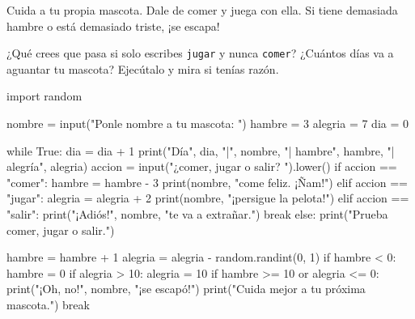 
Cuida a tu propia mascota. Dale de comer y juega con ella. Si tiene demasiada hambre o está demasiado triste, ¡se escapa!

\begin{center}
\begin{scratch}[scale=0.8]
\end{scratch}
\end{center}

\begin{think}
¿Qué crees que pasa si solo escribes \texttt{jugar} y nunca \texttt{comer}? ¿Cuántos días va a aguantar tu mascota? Ejecútalo y mira si tenías razón.
\end{think}

\begin{typethis}
import random

nombre = input("Ponle nombre a tu mascota: ")
hambre = 3
alegria = 7
dia = 0

while True:
    dia = dia + 1
    print("Día", dia, "|", nombre, "| hambre", hambre,
          "| alegría", alegria)
    accion = input("¿comer, jugar o salir? ").lower()
    if accion == "comer":
        hambre = hambre - 3
        print(nombre, "come feliz. ¡Ñam!")
    elif accion == "jugar":
        alegria = alegria + 2
        print(nombre, "¡persigue la pelota!")
    elif accion == "salir":
        print("¡Adiós!", nombre, "te va a extrañar.")
        break
    else:
        print("Prueba comer, jugar o salir.")

    hambre = hambre + 1
    alegria = alegria - random.randint(0, 1)
    if hambre < 0:
        hambre = 0
    if alegria > 10:
        alegria = 10
    if hambre >= 10 or alegria <= 0:
        print("¡Oh, no!", nombre, "¡se escapó!")
        print("Cuida mejor a tu próxima mascota.")
        break
\end{typethis}

